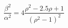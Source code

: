 \begin{equation}
\frac{\beta^{2}}{\alpha^{2}}=4\frac{\rho^2-2.5\rho+1}{(\rho^2-1)^{2}}
\label{bolt4}
\end{equation}

